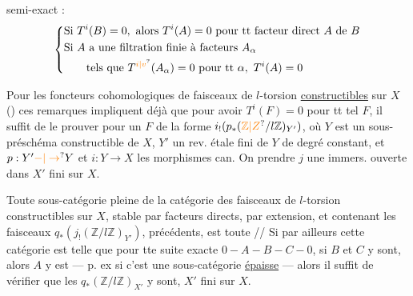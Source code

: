 



semi-exact :
\[
\left\{\begin{aligned}
 &\text{Si }T^i(B)=0,\ \text{alors }T^i(A)=0\ \text{pour tt facteur direct }A\text{ de }B\\
 &\text{Si } A\text{ a une filtration finie à facteurs }A_\alpha\\
 &\qquad\text{tels que }T^{\unsure{i|v}}(A_\alpha)=0\ \text{pour tt }\alpha,\ T^i(A)=0
\end{aligned}\right.
\]

Pour les foncteurs cohomologiques de faisceaux de $l$-torsion \uline{constructibles} sur $X$ () ces remarques  impliquent déjà que pour avoir $T^i(F)=0$ pour tt tel $F$, il suffit de le prouver pour un $F$ de la forme $i_!(p_*(\unsure{\mathbb Z|Z}/l\mathbb Z)_{Y'})$, où $Y$ est un sous-préschéma constructible de $X$, $Y'$ un rev. étale fini de $Y$ de degré constant, et $p:Y'\unsure{\mathord{-}|\to}Y$ et $i:Y\to X$ les morphismes can. On  prendre $j$ une immers. ouverte dans $X'$ fini sur $X$.


Toute sous-catégorie pleine de la catégorie des faisceaux de $l$-torsion constructibles sur $X$, stable par facteurs directs, par extension, et contenant les faisceaux $q_*(j_!(\mathbb Z/l\mathbb Z)_{Y'})$, précédents, est toute // Si par ailleurs cette catégorie est  telle que pour tte suite exacte $0-A-B-C-0$, si $B$ et $C$ y sont, alors $A$ y est --- p. ex si c'est une sous-catégorie \uline{épaisse} --- alors il suffit de vérifier que les $q_*(\mathbb Z/l\mathbb Z)_{X'}$ y sont, $X'$ fini sur $X$.

